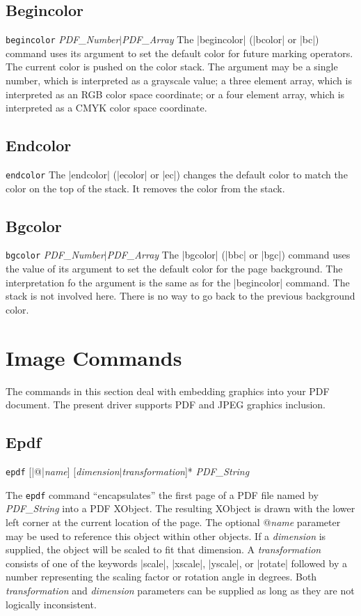 {\subsection{Begincolor}
\syntax
{\tt begincolor} {\it PDF\_Number$\vert$\it PDF\_Array}
\description
The |begincolor| (|bcolor| or |bc|) command uses its
argument to set the default color for future marking operators.
The current color is pushed on the color stack.  The argument
may be a single number, which is interpreted as a grayscale
value; a three element array, which is interpreted as an RGB
color space coordinate; or a four element array, which
is interpreted as a CMYK color space coordinate.
\example
\begintt
{}
\endtt

\subsection{Endcolor}
\syntax
{\tt endcolor}
\description
The |endcolor| (|ecolor| or |ec|)
changes the default color to
match the color on the top
of the stack.  It removes
the color from the stack.
\example
\begintt
{}
\endtt

\subsection{Bgcolor}
\syntax
{\tt bgcolor} {\it PDF\_Number$\vert$\it PDF\_Array}
\description
The |bgcolor| (|bbc| or |bgc|) command uses the value
of its argument to set the default color for the page
background.  The interpretation
fo the argument is the same as for the |begincolor| command.
The stack is not involved here.  There is no way
to go back to the previous background color.
\example
\begintt
{}
\endtt

\section{Image Commands}
The commands in this section deal with embedding
graphics into your PDF document.  The present
driver supports PDF and JPEG graphics inclusion.

\subsection{Epdf}
\syntax
{\tt epdf} [|@|{\it name}] [{\it dimension}$\vert${\it transformation}]*  {\it PDF\_String}

\description
The {\tt epdf} command ``encapsulates'' the first page of a PDF
file named by {\it PDF\_String}
into a PDF XObject.  The resulting XObject is drawn
with the lower left corner at the current location of the page.
The optional @{\it name} parameter may be used
to reference this object within other objects.  If a
{\it dimension} is supplied, the object will be scaled to fit
that dimension.  A {\it transformation} consists of one of the keywords
|scale|, |xscale|, |yscale|, or |rotate|
followed by a number representing
the scaling factor or rotation angle in degrees.  Both {\it transformation} and {\it dimension}
parameters can be supplied as long as they are not logically
inconsistent.

}
